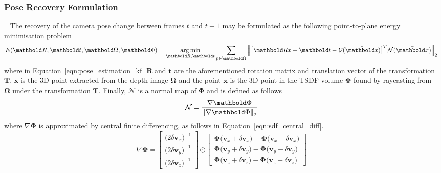 \subsubsection{Pose Recovery Formulation}
~\label{subsub:moseg_static_camera_poserec}
The recovery of the camera pose change between frames \(t\) and \(t-1\) may be
formulated as the following point-to-plane energy minimisation problem
\begin{equation}
  \label{eqn:pose_estimation_kf}
  E(\bm{R}, \bm{t}, \bm{\Omega}, \bm{\Phi}) =
  \argmin_{\bm{R}, \bm{t}} \sum_{p \in \bm{\Omega}}
  \norm{{\left[
    \bm{Rx} + \bm{t} - \mathcal{V}(\bar{\bm{x}})
  \right]}^{T}
  \mathcal{N}(\bar{\bm{x}})}
\end{equation}
where in Equation~\ref{eqn:pose_estimation_kf} \(\bm{R}\) and \(\bm{t}\) are 
the aforementioned rotation matrix and translation vector of the transformation 
\(\bm{T}\). \(\bm{x}\) is the 3D point extracted from the depth image 
\(\bm{\Omega}\) and the point \(\bar{\bm{x}}\) is the 3D point in the TSDF 
volume \(\bm{\Phi}\) found by raycasting from \(\bm{\Omega}\) under the 
transformation \(\bm{T}\). Finally, \(\mathcal{N}\) is a normal map of 
\(\bm{\Phi}\) and is defined as follows
\begin{equation}
  \label{eqn:normal_map_definition}
  \mathcal{N} = \frac{\nabla \bm{\Phi}}{\norm{\nabla \bm{\Phi}}}
\end{equation}
where \(\nabla \bm{\Phi}\) is approximated by central finite differencing, 
as follows in Equation~\ref{eqn:sdf_central_diff}.
\begin{equation}
  \label{eqn:sdf_central_diff}
  \nabla \bm{\Phi} = 
    \begin{bmatrix}
      {\big( 2 \delta \bm{v}_{x} \big)}^{-1} \\
      {\big( 2 \delta \bm{v}_{y} \big)}^{-1} \\
      {\big( 2 \delta \bm{v}_{z} \big)}^{-1}
    \end{bmatrix}
    \odot
    \begin{bmatrix}
      \bm{\Phi} \big(\bm{v}_{x} + \delta \bm{v}_{x}\big) - \bm{\Phi} \big(\bm{v}_{x} - \delta \bm{v}_{x}\big) \\
      \bm{\Phi} \big(\bm{v}_{y} + \delta \bm{v}_{y}\big) - \bm{\Phi} \big(\bm{v}_{y} - \delta \bm{v}_{y}\big) \\
      \bm{\Phi} \big(\bm{v}_{z} + \delta \bm{v}_{z}\big) - \bm{\Phi} \big(\bm{v}_{z} - \delta \bm{v}_{z}\big) 
    \end{bmatrix}
\end{equation}


